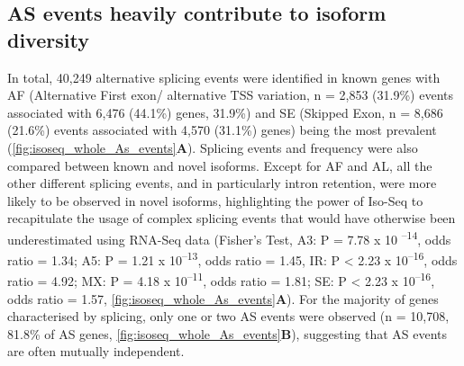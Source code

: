 \subsection{AS events heavily contribute to isoform diversity}
\label{ch4_AS}
In total, 40,249 alternative splicing events were identified in known genes with AF (Alternative First exon/ alternative TSS variation, n = 2,853 (31.9\%) events associated with 6,476 (44.1\%) genes, 31.9\%) and SE (Skipped Exon, n = 8,686 (21.6\%) events associated with 4,570 (31.1\%) genes) being the most prevalent (\cref{fig:isoseq_whole_As_events}\textbf{A}). Splicing events and frequency were also compared between known and novel isoforms. Except for AF and AL, all the other different splicing events, and in particularly intron retention, were more likely to be observed in novel isoforms, highlighting the power of Iso-Seq to recapitulate the usage of complex splicing events that would have otherwise been underestimated using RNA-Seq data (Fisher's Test, A3: P = 7.78 x 10 \textsuperscript{–14}, odds ratio = 1.34; A5: P = 1.21 x 10\textsuperscript{–13}, odds ratio = 1.45, IR: P < 2.23 x 10\textsuperscript{–16}, odds ratio = 4.92; MX: P = 4.18 x 10\textsuperscript{–11}, odds ratio = 1.81; SE: P < 2.23 x 10\textsuperscript{–16}, odds ratio = 1.57, \cref{fig:isoseq_whole_As_events}\textbf{A}). For the majority of genes characterised by splicing, only one or two AS events were observed (n = 10,708, 81.8\% of AS genes, \cref{fig:isoseq_whole_As_events}\textbf{B}), suggesting that AS events are often mutually independent. 

